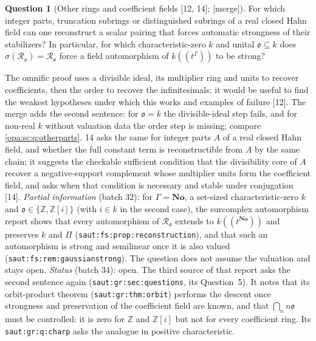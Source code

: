 \documentclass[11pt,oneside]{article}
\numberwithin{equation}{section}
\theoremstyle{definition}
\newtheorem{question}[question]{Question}
\theoremstyle{remark}
\newcommand{\No}{\mathbf{No}}
\newcommand{\Z}{\mathbb Z}
\newcommand{\oo}{\mathfrak o}
\newcommand{\Ro}{\mathcal R_{\oo}}
\newcommand{\Hahn}[2]{#1((t^{#2}))}
\newcommand{\src}[1]{\textup{\textsf{\small[#1]}}}
\newcommand{\mergetag}{\textup{\textsf{\small[merge]}}}
\newcommand{\lbl}[1]{\nolinkurl{#1}}
\begin{document}
\begin{question}[Other rings and coefficient fields \src{12, 14}; \mergetag]\label{opa:as:q:otherrings}
For which integer parts, truncation subrings or distinguished subrings of a real closed Hahn field can one reconstruct a
scalar pairing that forces automatic strongness of their stabilizers? In particular, for which characteristic-zero $k$
and unital $\oo\subseteq k$ does $\sigma(\Ro)=\Ro$ force a field automorphism of $\Hahn k\Gamma$ to be strong?
\end{question}
The omnific proof uses a divisible ideal, its multiplier ring and units to recover coefficients, then the order to
recover the infinitesimals; it would be useful to find the weakest hypotheses under which this works and examples of
failure \src{12}. The merge adds the second sentence: for $\oo=k$ the divisible-ideal step fails, and for non-real $k$
without valuation data the order step is missing; compare \cref{opa:sc:q:otherparts}. 14 asks the same for integer
parts $A$ of a real closed Hahn field, and whether the full constant term is reconstructible from $A$ by the same chain;
it suggests the checkable sufficient condition that the divisibility core of $A$ recover a negative-support complement
whose multiplier units form the coefficient field, and asks when that condition is necessary and stable under
conjugation \src{14}. \emph{Partial information} (batch 32): for $\Gamma=\No$, a set-sized characteristic-zero $k$
and $\oo\in\{\Z,\Z[i]\}$ (with $i\in k$ in the second case), the surcomplex automorphism report shows that every automorphism of $\Ro$ extends to
$\Hahn k\No$ and preserves $k$ and $\Pi$ (\lbl{saut:fs:prop:reconstruction}), and that such an automorphism is strong
and semilinear once it is also valued (\lbl{saut:fs:rem:gaussianstrong}). The question does not assume the valuation
and stays open. \emph{Status} (batch 34): open. The third source of that report asks the second sentence again
(\lbl{saut:gr:sec:questions}, its Question~5). It notes that its orbit-product theorem (\lbl{saut:gr:thm:orbit})
performs the descent once strongness and preservation of the coefficient field are known, and that
$\bigcap_nn\oo$ must be controlled: it is zero for $\Z$ and $\Z[i]$ but not for every coefficient ring. Its
\lbl{saut:gr:q:charp} asks the analogue in positive characteristic.
\end{document}
